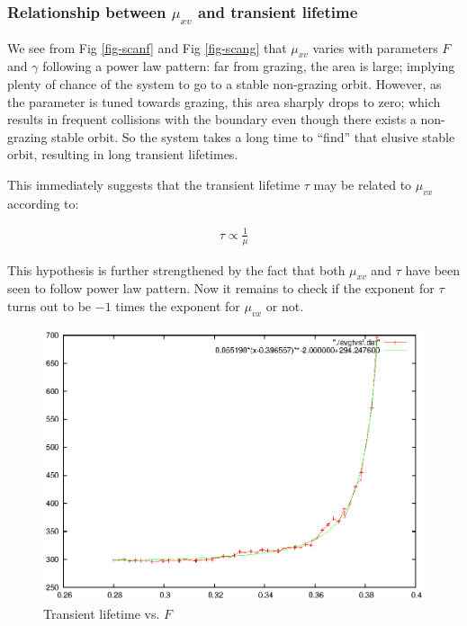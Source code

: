 \documentclass{book}
\renewcommand{\(}{\begin{columns}}
\renewcommand{\)}{\end{columns}}
\newcommand{\<}[1]{\begin{column}{#1}}
\renewcommand{\>}{\end{column}}
\begin{document}
\subsubsection{Relationship between $\mu_{xv}$ and transient lifetime}
We see from Fig \ref{fig-scanf} and Fig \ref{fig-scang}  that $\mu_{xv}$ varies with parameters $F$ and $\gamma$ following a power law 
pattern: far from grazing, the area is large; implying plenty of chance of the 
system to go to a stable non-grazing orbit.  However, as the parameter is 
tuned towards grazing, this area sharply drops to zero; which results in 
frequent collisions with the boundary even though there exists a non-grazing 
stable orbit.  So the system takes a long time to ``find'' that elusive stable 
orbit, resulting in long transient lifetimes. 

This immediately suggests that the transient lifetime $\tau$ may be related to 
$\mu_{vx}$ according to:

\begin{align}
\label{eq-hypo-mu}
\tau\propto\frac{1}{\mu}
\end{align} 


This hypothesis is further strengthened by the fact that both $\mu_{xv}$ and 
$\tau$ have been seen to follow power law pattern.  Now it remains to check if 
the exponent for $\tau$ turns out to be $-1$ times the exponent for $\mu_{vx}$ 
or not.  

\begin{figure}
\caption{Transient lifetime vs.  $F$}
\begin{center}
\includegraphics[width=0.8\columnwidth]{trans_life_vsf_matches}
\end{center}
\end{figure}
\end{document}
